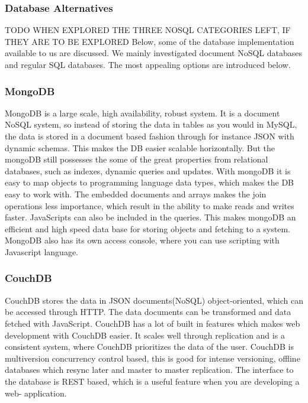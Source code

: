 \subsubsection{Database Alternatives}
TODO WHEN EXPLORED THE THREE NOSQL CATEGORIES LEFT, IF THEY ARE TO BE EXPLORED
Below, some of the database implementation available to us are discussed. We mainly investigated document NoSQL databases and regular SQL databases. The most appealing options are introduced below.


\subsubsection*{MongoDB}
MongoDB is a large scale, high availability, robust system. It is a document NoSQL system, so instead of storing the data in tables as you would in MySQL, the data is stored in a document based fashion through for instance JSON with dynamic schemas. This makes the DB easier scalable horizontally. But the mongoDB still possesses the some of the great properties from relational databases, such as indexes, dynamic queries and updates. With mongoDB it is easy to map objects to programming language data types, which makes the DB easy to work with. The embedded documents and arrays makes the join operations less importance, which result in the ability to make reads and writes faster. JavaScripts can also be included in the queries. This makes mongoDB an efficient and high speed data base for storing objects and fetching to a system. MongoDB also has its own access console, where you can use scripting with Javascript language. \cite{mongodb-intro}


\subsubsection*{CouchDB}
CouchDB stores the data in JSON documents(NoSQL) object-oriented, which can be accessed through HTTP. The data documents can be transformed and data fetched with JavaScript. CouchDB has a lot of built in features which makes web development with CouchDB easier. It scales well through replication and is a consistent system, where CouchDB prioritizes the data of the user. CouchDB is multiversion concurrency control based, this is good for intense versioning, offline databases which resync later and master to master replication. The interface to the database is REST based, which is a useful feature when you are developing a web- application.
\cite{couchdb-about, couchdb-technical}



